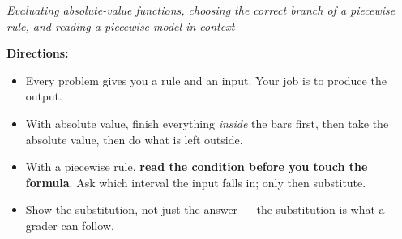 \documentclass[12pt]{article}
\begin{document}

\begin{center}\small\textit{Evaluating absolute-value functions, choosing the correct
branch of a piecewise rule, and reading a piecewise model in context}\end{center}

\noindent\small\textbf{Directions:}
\begin{itemize}[label={$\bullet$}, leftmargin=1.1cm, itemsep=1pt, topsep=2pt]
  \item Every problem gives you a rule and an input. Your job is to produce the output.
  \item With absolute value, finish everything \emph{inside} the bars first, then take the
        absolute value, then do what is left outside.
  \item With a piecewise rule, \textbf{read the condition before you touch the formula}.
        Ask which interval the input falls in; only then substitute.
  \item Show the substitution, not just the answer --- the substitution is what a grader
        can follow.
\end{itemize}
\normalsize
\end{document}
